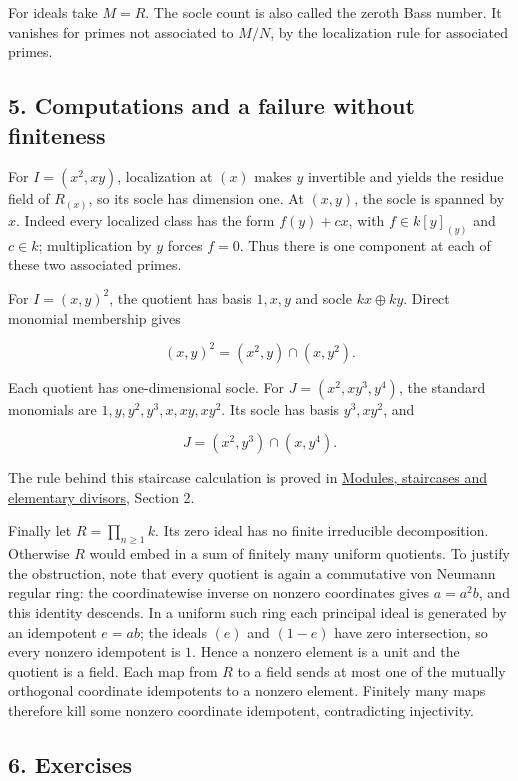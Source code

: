 \documentclass[
]{article}
\begin{document}
For ideals take \(M=R\). The socle count is also called the zeroth Bass
number. It vanishes for primes not associated to \(M/N\), by the
localization rule for associated primes.

\subsection{5. Computations and a failure without
finiteness}\label{computations-and-a-failure-without-finiteness}

For \(I=(x^2,xy)\), localization at \((x)\) makes \(y\) invertible and
yields the residue field of \(R_{(x)}\), so its socle has dimension one.
At \((x,y)\), the socle is spanned by \(x\). Indeed every localized
class has the form \(f(y)+cx\), with \(f\in k[y]_{(y)}\) and \(c\in k\);
multiplication by \(y\) forces \(f=0\). Thus there is one component at
each of these two associated primes.

For \(I=(x,y)^2\), the quotient has basis \(1,x,y\) and socle
\(kx\oplus ky\). Direct monomial membership gives

\[
(x,y)^2=(x^2,y)\cap(x,y^2).
\]

Each quotient has one-dimensional socle. For \(J=(x^2,xy^3,y^4)\), the
standard monomials are \(1,y,y^2,y^3,x,xy,xy^2\). Its socle has basis
\(y^3,xy^2\), and

\[
J=(x^2,y^3)\cap(x,y^4).
\]

The rule behind this staircase calculation is proved in
\href{../NOE-IDL-03.html}{Modules, staircases and elementary divisors},
Section 2.

Finally let \(R=\prod_{n\ge1}k\). Its zero ideal has no finite
irreducible decomposition. Otherwise \(R\) would embed in a sum of
finitely many uniform quotients. To justify the obstruction, note that
every quotient is again a commutative von Neumann regular ring: the
coordinatewise inverse on nonzero coordinates gives \(a=a^2b\), and this
identity descends. In a uniform such ring each principal ideal is
generated by an idempotent \(e=ab\); the ideals \((e)\) and \((1-e)\)
have zero intersection, so every nonzero idempotent is \(1\). Hence a
nonzero element is a unit and the quotient is a field. Each map from
\(R\) to a field sends at most one of the mutually orthogonal coordinate
idempotents to a nonzero element. Finitely many maps therefore kill some
nonzero coordinate idempotent, contradicting injectivity.

\subsection{6. Exercises}\label{exercises}
\end{document}
